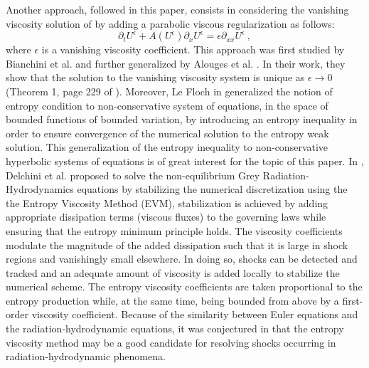\documentclass[times]{fldauth}
\begin{document}
Another approach, followed in this paper, consists in considering the 
vanishing viscosity solution of  by adding a parabolic viscous regularization as follows:
%
\begin{equation}
\label{eq:nc-syst-eq-visc}
\partial_t U^\epsilon + A(U^\epsilon) \partial_x U^\epsilon = \epsilon \partial_{xx} U^\epsilon \ , \nonumber
\end{equation}
%
where $\epsilon$ is a vanishing viscosity coefficient. This approach was first studied by Bianchini et al. \cite{bianchini_bressan_2005} and 
further generalized by Alouges et al. \cite{alouges_merlet_2004}. In their work, they show that the solution to the 
vanishing viscosity system is unique as $\epsilon \to 0$ (Theorem 1, page 229 of \cite{bianchini_bressan_2005}). Moreover, Le 
Floch in \cite{lefloch_1988} generalized the notion of entropy condition to non-conservative system of equations, in the space of 
bounded functions of bounded variation, by introducing an entropy inequality in order to ensure convergence of the 
numerical solution to the entropy weak solution. 
%
This generalization of the entropy inequality to non-conservative hyperbolic systems of equations is of great interest 
for the topic of this paper.
In \cite{our_jcp_radhy_paper}, Delchini et al. proposed to solve the non-equilibrium Grey Radiation-Hydrodynamics 
equations by stabilizing the numerical discretization using the the Entropy Viscosity Method (EVM), 
stabilization is achieved by adding appropriate dissipation terms (viscous fluxes) to the governing laws while ensuring 
that the entropy minimum principle holds. 
The viscosity coefficients modulate the magnitude of the added dissipation such that it is large in shock regions 
and vanishingly small elsewhere. In doing so, shocks can be detected and tracked and an adequate amount of viscosity 
is added locally to stabilize the numerical scheme. 
The entropy viscosity coefficients are taken proportional to the entropy production while, at the same time, 
being bounded from above by a first-order viscosity coefficient.
Because of the similarity between Euler equations and the radiation-hydrodynamic equations, it was conjectured in 
\cite{our_jcp_radhy_paper} that the entropy 
viscosity method may be a good candidate for resolving shocks occurring in radiation-hydrodynamic phenomena.
\end{document}
